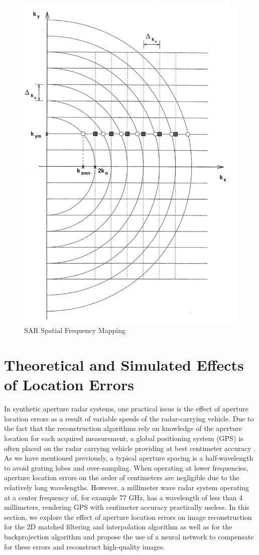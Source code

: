 \documentclass{article}
\begin{document}
\begin{figure}[h!]
    \centering
    \includegraphics[width = .5\textwidth]{Figures/SAR_spatial_freq_map.png}
    \caption{SAR Spatial Frequency Mapping}
    \label{SAR_spatial_freq_map}
\end{figure}

\section{Theoretical and Simulated Effects of Location Errors}
\indent\indent
In synthetic aperture radar systems, one practical issue is the effect of aperture location errors as a result of variable speeds of the radar-carrying vehicle. Due to the fact that the reconstruction algorithms rely on knowledge of the aperture location for each acquired measurement, a global positioning system (GPS) is often placed on the radar carrying vehicle providing at best centimeter accuracy \cite{SARbook}. 
\newline
\indent
As we have mentioned previously, a typical aperture spacing is a half-wavelength to avoid grating lobes and over-sampling. When operating at lower frequencies, aperture location errors on the order of centimeters are negligible due to the relatively long wavelengths. However, a millimeter wave radar system operating at a center frequency of, for example 77 GHz, has a wavelength of less than 4 millimeters, rendering GPS with centimeter accuracy practically useless. In this section, we explore the effect of aperture location errors on image reconstruction for the 2D matched filtering and interpolation algorithm as well as for the backprojection algorithm and propose the use of a neural network to compensate for these errors and reconstruct high-quality images.
\end{document}
